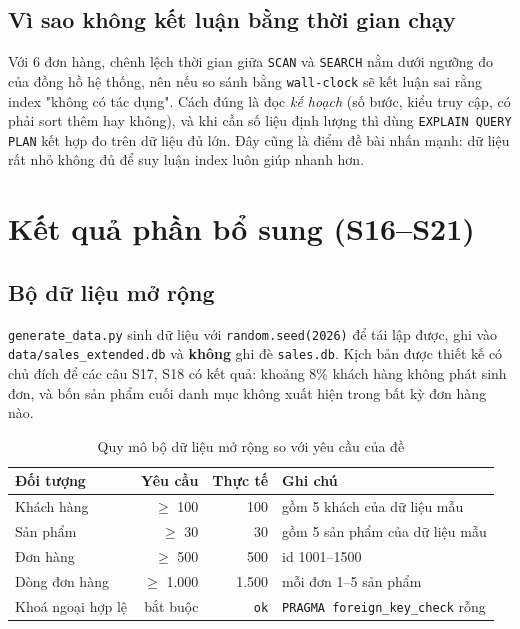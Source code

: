 \documentclass[12pt,a4paper]{article}
\newcommand{\code}[1]{\texttt{\small #1}}
\begin{document}
\subsection{Vì sao không kết luận bằng thời gian chạy}

Với 6 đơn hàng, chênh lệch thời gian giữa \code{SCAN} và \code{SEARCH} nằm dưới ngưỡng đo của
đồng hồ hệ thống, nên nếu so sánh bằng \code{wall-clock} sẽ kết luận sai rằng index "không có
tác dụng". Cách đúng là đọc \emph{kế hoạch} (số bước, kiểu truy cập, có phải sort thêm hay
không), và khi cần số liệu định lượng thì dùng \code{EXPLAIN QUERY PLAN} kết hợp đo trên dữ liệu
đủ lớn. Đây cũng là điểm đề bài nhấn mạnh: dữ liệu rất nhỏ không đủ để suy luận index luôn giúp
nhanh hơn.

\section{Kết quả phần bổ sung (S16--S21)}
\label{sec:extended}

\subsection{Bộ dữ liệu mở rộng}

\code{generate\_data.py} sinh dữ liệu với \code{random.seed(2026)} để tái lập được, ghi vào
\code{data/sales\_extended.db} và \textbf{không} ghi đè \code{sales.db}. Kịch bản được thiết kế
có chủ đích để các câu S17, S18 có kết quả: khoảng 8\% khách hàng không phát sinh đơn, và bốn
sản phẩm cuối danh mục không xuất hiện trong bất kỳ đơn hàng nào.

\begin{table}[H]
\centering
\caption{Quy mô bộ dữ liệu mở rộng so với yêu cầu của đề}
\label{tab:extended}
\small
\begin{tabular}{@{}l r r l@{}}
\toprule
\textbf{Đối tượng} & \textbf{Yêu cầu} & \textbf{Thực tế} & \textbf{Ghi chú} \\
\midrule
Khách hàng    & $\geq$ 100 & 100  & gồm 5 khách của dữ liệu mẫu \\
Sản phẩm      & $\geq$ 30  & 30   & gồm 5 sản phẩm của dữ liệu mẫu \\
Đơn hàng      & $\geq$ 500 & 500  & id 1001--1500 \\
Dòng đơn hàng & $\geq$ 1.000 & 1.500 & mỗi đơn 1--5 sản phẩm \\
Khoá ngoại hợp lệ & bắt buộc & \code{ok} & \code{PRAGMA foreign\_key\_check} rỗng \\
\bottomrule
\end{tabular}
\end{table}
\end{document}
